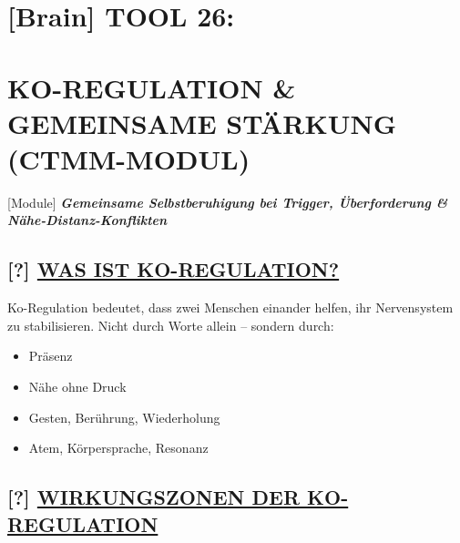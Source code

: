 \hypertarget{tool-26}{%
\section{\texorpdfstring{[Brain] \textbf{TOOL 26:} }{[Brain] TOOL 26: }}\label{tool-26}}

\hypertarget{ko-regulation-gemeinsame-stuxe4rkung-ctmm-modul}{%
\section{\texorpdfstring{\textbf{KO-REGULATION \& GEMEINSAME STÄRKUNG (CTMM-MODUL)}}{KO-REGULATION \& GEMEINSAME STÄRKUNG (CTMM-MODUL)}}\label{ko-regulation-gemeinsame-stuxe4rkung-ctmm-modul}}

[Module] \emph{\textbf{Gemeinsame Selbstberuhigung bei Trigger, Überforderung \& Nähe-Distanz-Konflikten}}

\hypertarget{was-ist-ko-regulation}{%
\subsection{\texorpdfstring{[?] \textbf{\ul{WAS IST KO-REGULATION?}}}{[?] WAS IST KO-REGULATION?}}\label{was-ist-ko-regulation}}

Ko-Regulation bedeutet, dass zwei Menschen einander helfen, ihr Nervensystem zu stabilisieren. Nicht durch Worte allein -- sondern durch:

\begin{itemize}
\tightlist
\item
  Präsenz
\item
  Nähe ohne Druck
\item
  Gesten, Berührung, Wiederholung
\item
  Atem, Körpersprache, Resonanz
\end{itemize}

\hypertarget{wirkungszonen-der-ko-regulation}{%
\subsection{\texorpdfstring{[?] \textbf{\ul{WIRKUNGSZONEN DER KO-REGULATION}}}{[?] WIRKUNGSZONEN DER KO-REGULATION}}\label{wirkungszonen-der-ko-regulation}}

